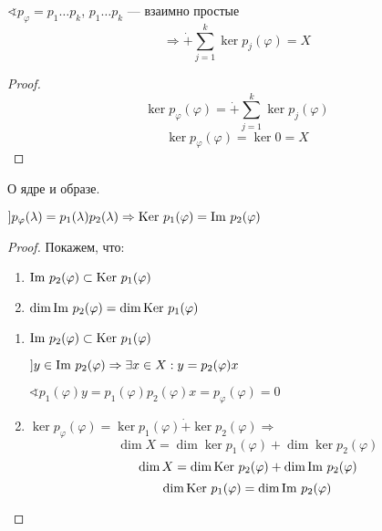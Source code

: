 \begin{theorem}
    $\sphericalangle p_\varphi=p_1\ldots p_k$, $p_1\ldots p_k$ --- взаимно простые
    $$\Rightarrow \dot+\sum_{j=1}^k \ker p_j(\varphi)=X$$
\end{theorem}
\begin{proof}
    $$\ker p_\varphi(\varphi)=\dot+\sum_{j=1}^k \ker p_j(\varphi)$$
    $$\ker p_\varphi(\varphi)=\ker 0 = X$$
\end{proof}
\begin{theorem}
    О ядре и образе.

    $] p_\varphi(\lambda)=p_1(\lambda)p_2(\lambda) \Rightarrow \text{Ker } p_1(\varphi)=\text{Im } p_2(\varphi)$
\end{theorem}
\begin{proof}
    Покажем, что:
    \begin{enumerate}
        \item $\text{Im } p_2(\varphi)\subset \text{Ker } p_1(\varphi)$
        \item $\dim \text{Im } p_2(\varphi)=\dim \text{Ker } p_1(\varphi)$
    \end{enumerate}

    \begin{enumerate}
        \item $\text{Im } p_2(\varphi)\subset \text{Ker } p_1(\varphi)$
        
        $] y \in \text{Im } p_2(\varphi) \Rightarrow \exists x\in X : y=p_2(\varphi) x$

        $\sphericalangle p_1(\varphi) y = p_1(\varphi)p_2(\varphi) x = p_\varphi(\varphi) = 0$

        \item $\ker p_\varphi(\varphi) = \ker p_1(\varphi) \dot+ \ker p_2(\varphi) \Rightarrow$
        $$\dim X = \dim \ker p_1(\varphi) + \dim \ker p_2(\varphi)$$
        $$\dim X = \dim \text{Ker } p_2(\varphi) + \dim \text{Im } p_2(\varphi)$$
        $$\dim \text{Ker } p_1(\varphi)=\dim \text{Im } p_2(\varphi)$$
    \end{enumerate}
\end{proof}

